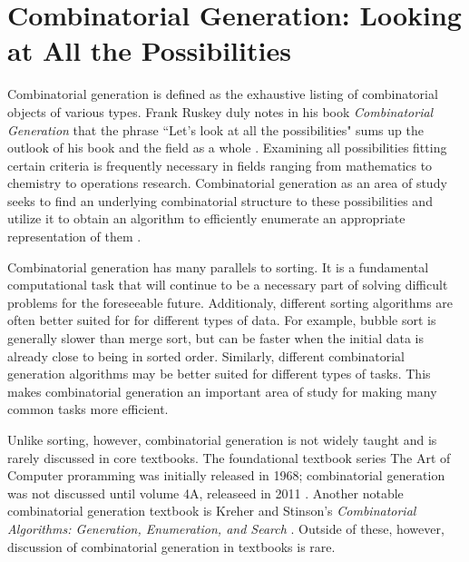 
\section{Combinatorial Generation: Looking at All the Possibilities}

Combinatorial generation is defined as the exhaustive listing of combinatorial objects of various types.  Frank Ruskey duly notes in his book \emph{Combinatorial Generation} that the phrase ``Let's look at all the possibilities" sums up the outlook of his book and the field as a whole \cite{ruskey2003combinatorial}. Examining all possibilities fitting certain criteria is frequently necessary in fields ranging from mathematics to chemistry to operations research. Combinatorial generation as an area of study seeks to find an underlying combinatorial structure to these possibilities and utilize it to obtain an algorithm to efficiently enumerate an appropriate representation of them \cite{ruskey2003combinatorial}. 

Combinatorial generation has many parallels to sorting.  It is a fundamental computational task that will continue to be a necessary part of solving difficult problems for the foreseeable future.  Additionaly, different sorting algorithms are often better suited for for different types of data.  For example, bubble sort is generally slower than merge sort, but can be faster when the initial data is already close to being in sorted order. Similarly, different combinatorial generation algorithms may be better suited for different types of tasks.  This makes combinatorial generation an important area of study for making many common tasks more efficient.  

Unlike sorting, however, combinatorial generation is not widely taught and is rarely discussed in core textbooks. The foundational textbook series The Art of Computer proramming was initially released in 1968; combinatorial generation was not discussed until volume 4A, releaseed in 2011 \cite{knuth2015art}.  Another notable combinatorial generation textbook is  Kreher and Stinson's \emph{Combinatorial Algorithms: Generation, Enumeration, and Search} \cite{kreher2020combinatorial}. Outside of these, however, discussion of combinatorial generation in textbooks is rare.

